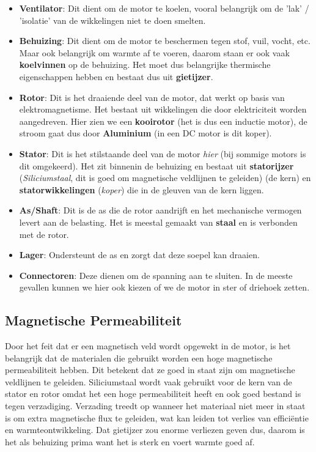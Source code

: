 \begin{itemize}
 \item \textbf{Ventilator}:
 Dit dient om de motor te koelen, vooral belangrijk om de 'lak' / 'isolatie' van de
 wikkelingen niet te doen smelten.
 \item \textbf{Behuizing}:
 Dit dient om de motor te beschermen tegen stof, vuil, vocht, etc.
 Maar ook belangrijk om warmte af te voeren, daarom staan er ook vaak \textbf{koelvinnen}
 op de behuizing.
 Het moet dus belangrijke thermische eigenschappen hebben en bestaat dus uit
 \textbf{gietijzer}.
 \item \textbf{Rotor}:
 Dit is het draaiende deel van de motor, dat werkt op basis van elektromagnetisme.
 Het bestaat uit wikkelingen die door elektriciteit worden aangedreven.
 Hier zien we een \textbf{kooirotor} (het is dus een inductie motor), de stroom gaat dus
 door \textbf{Aluminium} (in een DC motor is dit koper).
 \item \textbf{Stator}:
 Dit is het stilstaande deel van de motor \textit{hier} (bij sommige motors is dit
 omgekeerd).
 Het zit binnenin de behuizing en bestaat uit \textbf{statorijzer}
 (\textit{Siliciumstaal}, dit is goed om magnetische veldlijnen te geleiden) (de kern) en
 \textbf{statorwikkelingen} (\textit{koper}) die in de gleuven van de kern liggen.
 \item \textbf{As/Shaft}:
 Dit is de as die de rotor aandrijft en het mechanische vermogen levert aan de belasting.
 Het is meestal gemaakt van \textbf{staal} en is verbonden met de rotor.
 \item \textbf{Lager}: Ondersteunt de as en zorgt dat deze soepel kan draaien.
 \item \textbf{Connectoren}:
 Deze dienen om de spanning aan te sluiten.
 In de meeste gevallen kunnen we hier ook kiezen of we de motor in ster of driehoek
 zetten.
\end{itemize}

\subsection{Magnetische Permeabiliteit}
Door het feit dat er een magnetisch veld wordt opgewekt in de motor, is het belangrijk dat
de materialen die gebruikt worden een hoge magnetische permeabiliteit hebben.
Dit betekent dat ze goed in staat zijn om magnetische veldlijnen te geleiden.
Siliciumstaal wordt vaak gebruikt voor de kern van de stator en rotor omdat het een hoge
permeabiliteit heeft en ook goed bestand is tegen verzadiging.
Verzading treedt op wanneer het materiaal niet meer in staat is om extra magnetische flux
te geleiden, wat kan leiden tot verlies van efficiëntie en warmteontwikkeling.
Dat gietijzer zou enorme verliezen geven dus, daarom is het als behuizing prima want het
is sterk en voert warmte goed af.

